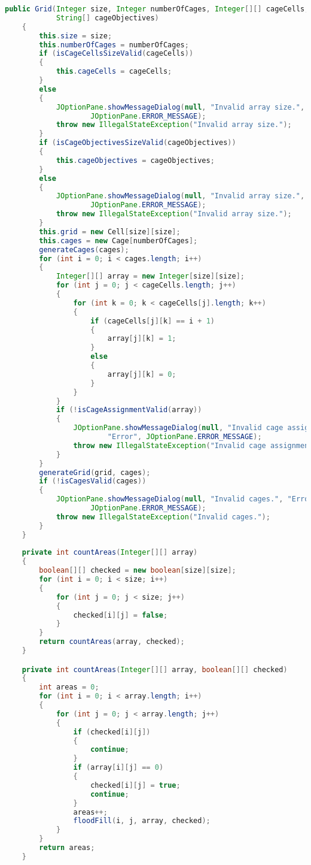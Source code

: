 \begin{lstlisting}[language=Java,basicstyle=\tiny,caption=Grid.java]
    public Grid(Integer size, Integer numberOfCages, Integer[][] cageCells, 
            String[] cageObjectives)
    {
        this.size = size;
        this.numberOfCages = numberOfCages;
        if (isCageCellsSizeValid(cageCells))
        {
            this.cageCells = cageCells;
        }
        else
        { 
            JOptionPane.showMessageDialog(null, "Invalid array size.", "Error", 
                    JOptionPane.ERROR_MESSAGE);
            throw new IllegalStateException("Invalid array size.");
        }
        if (isCageObjectivesSizeValid(cageObjectives))
        {
            this.cageObjectives = cageObjectives;
        }
        else
        {
            JOptionPane.showMessageDialog(null, "Invalid array size.", "Error", 
                    JOptionPane.ERROR_MESSAGE);
            throw new IllegalStateException("Invalid array size.");
        }
        this.grid = new Cell[size][size];
        this.cages = new Cage[numberOfCages];
        generateCages(cages);
        for (int i = 0; i < cages.length; i++)
        {
            Integer[][] array = new Integer[size][size];
            for (int j = 0; j < cageCells.length; j++)
            {
                for (int k = 0; k < cageCells[j].length; k++)
                {
                    if (cageCells[j][k] == i + 1)
                    {
                        array[j][k] = 1;
                    }
                    else
                    {
                        array[j][k] = 0;
                    }
                }
            }
            if (!isCageAssignmentValid(array))
            { 
                JOptionPane.showMessageDialog(null, "Invalid cage assignment.",
                        "Error", JOptionPane.ERROR_MESSAGE);
                throw new IllegalStateException("Invalid cage assignment.");
            }
        }
        generateGrid(grid, cages);
        if (!isCagesValid(cages))
        {
            JOptionPane.showMessageDialog(null, "Invalid cages.", "Error", 
                    JOptionPane.ERROR_MESSAGE);
            throw new IllegalStateException("Invalid cages.");
        }
    }
    
    private int countAreas(Integer[][] array)
    {
        boolean[][] checked = new boolean[size][size];
        for (int i = 0; i < size; i++)
        {
            for (int j = 0; j < size; j++)
            {
                checked[i][j] = false;
            }
        }
        return countAreas(array, checked);
    }

    private int countAreas(Integer[][] array, boolean[][] checked)
    {
        int areas = 0;
        for (int i = 0; i < array.length; i++)
        {
            for (int j = 0; j < array.length; j++)
            {
                if (checked[i][j])
                {
                    continue;
                }
                if (array[i][j] == 0)
                {
                    checked[i][j] = true;
                    continue;
                }
                areas++;
                floodFill(i, j, array, checked); 
            }
        }
        return areas;
    }


\end{lstlisting}
